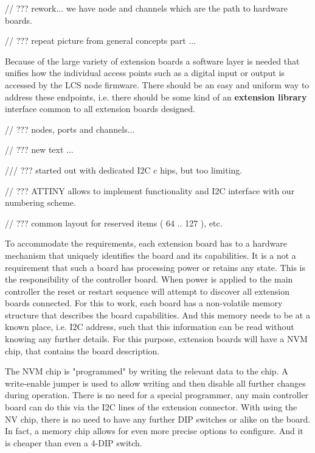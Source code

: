 
// ??? rework... we have node and channels which are the path to hardware boards.




// ??? repeat picture from general concepts part ...



Because of the large variety of extension boards a software layer is needed that unifies how the individual access points such as a digital input or output is accessed by the LCS node firmware. There should be an easy and uniform way to address these endpoints, i.e. there should be some kind of an \textbf{extension library} interface common to all extension boards designed.



// ??? nodes, ports and channels...

// ??? new text ... 

/// ??? started out with dedicated I2C c hips, but too limiting.

// ??? ATTINY allows to implement functionality and I2C interface with our numbering scheme.

// ??? common layout for reserved items ( 64 .. 127 ), etc.

To accommodate the requirements, each extension board has to a hardware mechanism that uniquely identifies the board and its capabilities. It is a not a requirement that such a board has processing power or retains any state. This is the responsibility of the controller board. When power is applied to the main controller the reset or restart sequence will attempt to discover all extension boards connected. For this to work, each board has a non-volatile memory structure that describes the board capabilities. And this memory needs to be at a known place, i.e. I2C address, such that this information can be read without knowing any further details. For this purpose, extension boards will have a NVM chip, that contains the board description.

The NVM chip is "programmed" by writing the relevant data to the chip. A write-enable jumper is used to allow writing and then disable all further changes during operation. There is no need for a special programmer, any main controller board can do this via the I2C lines of the extension connector. With using the NV chip, there is no need to have any further DIP switches or alike on the board. In fact, a memory chip allows for even more precise options to configure. And it is cheaper than even a 4-DIP switch.

